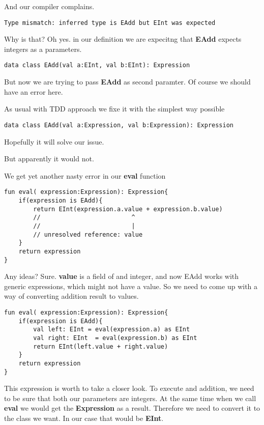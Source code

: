 \documentclass[11pt]{article}
\begin{document}
And our compiler complains.
\begin{verbatim}
Type mismatch: inferred type is EAdd but EInt was expected
\end{verbatim}

Why is that? Oh yes. in our definition we are expecitng that \textbf{EAdd} expects integers as a parameters.
\begin{verbatim}
data class EAdd(val a:EInt, val b:EInt): Expression
\end{verbatim}
But now we are trying to pass \textbf{EAdd} as second paramter. Of course we should have an error here.

As usual with TDD approach we fixe it with the simplest way possible
\begin{verbatim}
data class EAdd(val a:Expression, val b:Expression): Expression
\end{verbatim}

Hopefully it will solve our issue.

But apparently it would not.

We get yet another nasty error in our \textbf{eval} function

\begin{verbatim}
fun eval( expression:Expression): Expression{
    if(expression is EAdd){
        return EInt(expression.a.value + expression.b.value)
        //                         ^
        //                         |
        // unresolved reference: value
    }
    return expression
}
\end{verbatim}

Any ideas?
Sure. \textbf{value} is a field of and integer, and now EAdd works with generic expressions, which might not have a value.
So we need to come up with a way of converting addition result to values.

\begin{verbatim}
fun eval( expression:Expression): Expression{
    if(expression is EAdd){
        val left: EInt = eval(expression.a) as EInt
        val right: EInt  = eval(expression.b) as EInt
        return EInt(left.value + right.value)
    }
    return expression
}
\end{verbatim}
This expression is worth to take a closer look.
To execute and addition, we need to be sure that both our parameters are integers.
At the same time when we call \textbf{eval} we would get the \textbf{Expression} as a result.
Therefore we need to convert it to the class we want. In our case that would be \textbf{EInt}.
\end{document}
